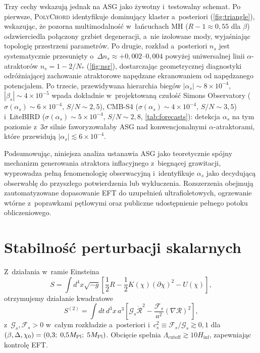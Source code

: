 \documentclass[11pt,a4paper]{article}
\begin{document}
Trzy cechy wskazują jednak na ASG jako żywotny i~testowalny schemat. Po pierwsze, \textsc{PolyChord} identyfikuje dominujący klaster a~posteriori (\cref{fig:triangle}), wskazując, że pozorna multimodalność w~łańcuchach MH ($R{-}1\approx0{,}55$ dla $\beta$) odzwierciedla połączony grzbiet degeneracji, a~nie izolowane mody, wyjaśniając topologię przestrzeni parametrów. Po drugie, rozkład a~posteriori $n_s$ jest systematycznie przesunięty o~$\Delta n_s\approx+0{,}002$--$0{,}004$ powyżej uniwersalnej linii $\alpha$-atraktorów $n_s=1-2/N_*$ (\cref{fig:nsr}), dostarczając geometrycznej diagnostyki odróżniającej zachowanie atraktorowe napędzane ekranowaniem od napędzanego potencjałem. Po trzecie, przewidywana hierarchia biegów $|\alpha_s|\sim8\times10^{-4}$, $|\beta_s|\sim4\times10^{-5}$ wpada dokładnie w~projektowaną czułość Simons Observatory ($\sigma(\alpha_s)\sim6\times10^{-4}$, $S/N\sim2{,}5$), CMB-S4 ($\sigma(\alpha_s)\sim4\times10^{-4}$, $S/N\sim3{,}5$) i~LiteBIRD ($\sigma(\alpha_s)\sim5\times10^{-4}$, $S/N\sim2{,}8$, \cref{tab:forecasts}): detekcja $\alpha_s$ na tym poziomie z~$3\sigma$ silnie faworyzowałaby ASG nad konwencjonalnymi $\alpha$-atraktorami, które przewidują $|\alpha_s|\lesssim6\times10^{-4}$.

Podsumowując, niniejsza analiza ustanawia ASG jako teoretycznie spójny mechanizm generowania atraktora inflacyjnego z~biegnącej grawitacji, wyprowadza pełną fenomenologię obserwacyjną i~identyfikuje $\alpha_s$ jako decydującą obserwablę do przyszłego potwierdzenia lub wykluczenia. Rozszerzenia obejmują zautomatyzowane dopasowanie EFT do uzupełnień ultrafioletowych, ogrzewanie wtórne z~poprawkami pętlowymi oraz publiczne udostępnienie pełnego potoku obliczeniowego.

\section{Stabilność perturbacji skalarnych}
\label{sec:stability}
Z~działania w~ramie Einsteina
\begin{equation}
S=\int d^{4}x\sqrt{-g}\left[\frac{1}{2}R-\frac{1}{2}K(\chi)(\partial\chi)^{2}-U(\chi)\right],
\end{equation}
otrzymujemy działanie kwadratowe
\begin{equation}
S^{(2)}=\int dt\,d^{3}x\,a^{3}\left[\mathcal{G}_{s}\dot{\mathcal{R}}^{2}-\frac{\mathcal{F}_{s}}{a^{2}}(\nabla\mathcal{R})^{2}\right],
\end{equation}
z~$\mathcal{G}_{s},\mathcal{F}_{s}>0$ w~całym rozkładzie a~posteriori i~$c_{s}^{2}\equiv\mathcal{F}_{s}/\mathcal{G}_{s}\gtrsim0{,}1$ dla $(\beta,\Delta,\chi_{0})=(0{,}3;\;0{,}5M_{\rm Pl};\;5M_{\rm Pl})$. Obcięcie spełnia $\Lambda_{\text{cutoff}}\gtrsim10H_{\text{inf}}$, zapewniając kontrolę EFT.
\end{document}
